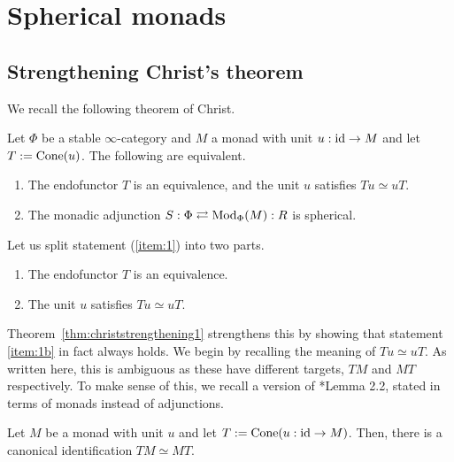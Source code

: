 \section{Spherical monads}\label{appendix:sphmonad}

\subsection{Strengthening Christ's theorem}\label{subsection:christ}
We recall the following theorem of Christ.

\begin{thm}\label{thm:christ}
    Let $\Phi$ be a stable $\infty$-category and $M$ a monad with unit $u:\operatorname{id}\to M$ and let $T:=\operatorname{Cone}(u)$. The following are equivalent.
    \begin{enumerate}
        \item \label{item:1} The endofunctor $T$ is an equivalence, and the unit $u$ satisfies $T u\simeq uT$.
        \item \label{item:2} The monadic adjunction $S:\Phi\rightleftarrows \operatorname{Mod}_\Phi(M):R$ is spherical.
    \end{enumerate}
\end{thm}

Let us split statement (\ref{item:1}) into two parts.
\begin{enumerate}[label=(\roman*)]
    \item \label{item:1a} The endofunctor $T$ is an equivalence.
    \item \label{item:1b} The unit $u$ satisfies $T u\simeq uT$.
\end{enumerate}

Theorem~\ref{thm:christstrengthening1} strengthens this by showing that statement \ref{item:1b} in fact always holds. We begin by recalling the meaning of $Tu\simeq uT$. As written here, this is ambiguous as these have different targets, $TM$ and $MT$ respectively. To make sense of this, we recall a version of \cite{christSphericalMonadicAdjunctions2023}*{Lemma 2.2}, stated in terms of monads instead of adjunctions.

\begin{lem}\label{lem:commutes}
    Let $M$ be a monad with unit $u$ and let $T:=\operatorname{Cone}(u:\operatorname{id}\to M)$. Then, there is a canonical identification $TM\simeq MT$.
\end{lem}

